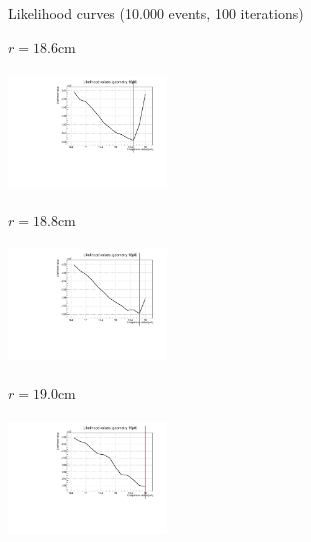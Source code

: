 \documentclass[8 pt]{beamer}
\begin{document}
\begin{frame}{Likelihood curves (10.000 events, 100 iterations)}
\vspace{-5pt}
\begin{minipage}[c]{.32\textwidth}
\begin{exampleblock}{} \begin{center}$r = 18.6$cm\end{center} \end{exampleblock}
\includegraphics[width=4.2cm, height=3.2cm]{figs/likelihood100LowStat/likelihood18p6.pdf} 
\end{minipage}
\begin{minipage}[c]{.32\textwidth}
\begin{exampleblock}{} \begin{center}$r = 18.8$cm\end{center} \end{exampleblock}
\includegraphics[width=4.2cm, height=3.2cm]{figs/likelihood100LowStat/likelihood18p8.pdf} 
\end{minipage}
\begin{minipage}[c]{.32\textwidth}
\begin{exampleblock}{} \begin{center}$r = 19.0$cm\end{center} \end{exampleblock}
\includegraphics[width=4.2cm, height=3.2cm]{figs/likelihood100LowStat/likelihood19p0.pdf} 
\end{minipage}
\end{frame}
\end{document}
